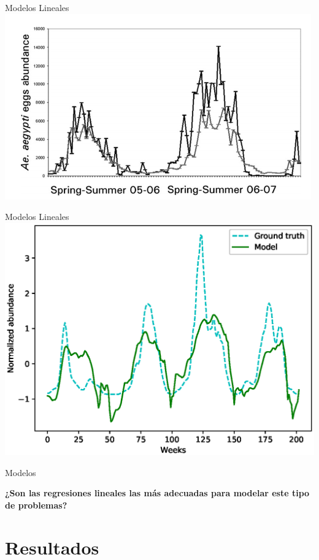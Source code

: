 \documentclass[10pt]{beamer}
\begin{document}
\begin{frame}{Modelos Lineales}
  \includegraphics[width=\textwidth]{lineal3.png}
\end{frame}

\begin{frame}{Modelos Lineales}
  \includegraphics[width=\textwidth]{linear.eps}
\end{frame}

\begin{frame}{Modelos}
  \begin{center}
    \textbf{¿Son las regresiones lineales las más adecuadas para modelar este
      tipo de problemas?}
  \end{center}
\end{frame}

\section{Resultados}
\end{document}
